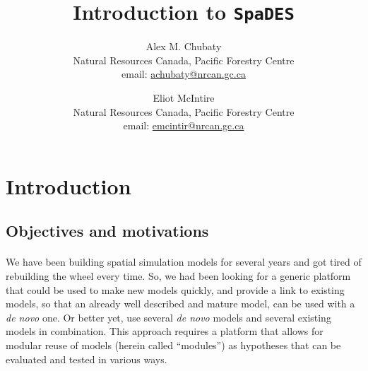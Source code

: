 \documentclass{article}
\title{Introduction to \texttt{SpaDES}}
\author{
  Alex M. Chubaty\\
	\small{Natural Resources Canada, Pacific Forestry Centre}\\
	\small{email: \href{mailto:achubaty@nrcan.gc.ca}{achubaty@nrcan.gc.ca}}
	\and
	Eliot McIntire\\
	\small{Natural Resources Canada, Pacific Forestry Centre}\\
	\small{email: \href{mailto:emcintir@nrcan.gc.ca}{emcintir@nrcan.gc.ca}}
}
\begin{document}


\maketitle


\tableofcontents

\newpage

\section{Introduction}

\subsection{Objectives and motivations}

\paragraph{}
We have been building spatial simulation models for several years and got tired of rebuilding the wheel every time. So, we had been looking for a generic platform that could be used to make new models quickly, and provide a link to existing models, so that an already well described and mature model, can be used with a \textit{de novo} one. Or better yet, use several \textit{de novo} models and several existing models in combination. This approach requires a platform that allows for modular reuse of models (herein called ``modules'') as hypotheses that can be evaluated and tested in various ways.
\end{document}
